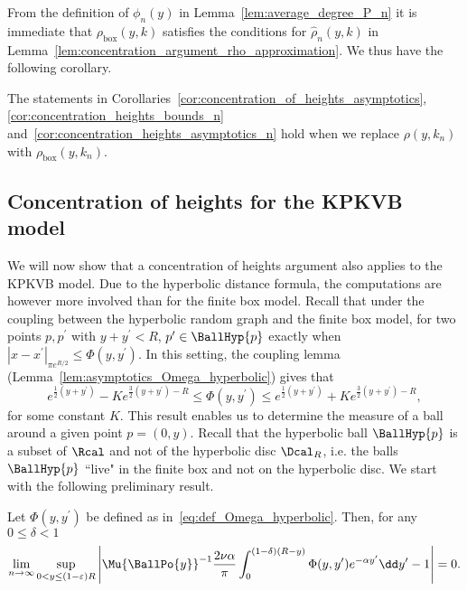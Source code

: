 From the definition of $\phi_n(y)$ in Lemma~\ref{lem:average_degree_P_n} it is immediate that $\rho_{\mathrm{box}}(y,k)$ satisfies the conditions for $\hat{\rho}_n(y,k)$ in Lemma~\ref{lem:concentration_argument_rho_approximation}. We thus have the following corollary.

\begin{corollary}\label{cor:concentration_of_heights_Gbox}
The statements in Corollaries~\ref{cor:concentration_of_heights_asymptotics}, \ref{cor:concentration_heights_bounds_n}
and~\ref{cor:concentration_heights_asymptotics_n} hold when we replace $\rho(y,k_n)$ with $\rho_{\text{box}}(y,k_n)$.
\end{corollary}

\subsection{Concentration of heights for the KPKVB model}\label{ssec:average_degree_HP_n}


We will now show that a concentration of heights argument also applies to the KPKVB model. Due to the hyperbolic distance formula, the computations are however more involved than for the finite box model. Recall that under the coupling between the hyperbolic random graph and the finite box model, for two points $p, p^\prime$ with $y + y^\prime < R$, $p^\prime \in \BallHyp{p}$ exactly when $|x-x^\prime|_{\pi e^{R/2}} \le \Phi(y,y^\prime)$. In this setting, the coupling lemma (Lemma~\ref{lem:asymptotics_Omega_hyperbolic}) gives that  
\[
	e^{\frac{1}{2}(y+y^\prime)} - K e^{\frac{3}{2}(y+y^\prime) - R} \leq \Phi(y, y^\prime) 
		\leq  e^{\frac{1}{2}(y+y^\prime)} + K e^{\frac{3}{2}(y+y^\prime) - R},
\]
for some constant $K$. This result enables us to determine the measure of a ball around a given point $p=(0,y)$. Recall that the hyperbolic ball $\BallHyp{p}$ is a subset of $\Rcal$ and not of the hyperbolic disc $\Dcal_{R}$, i.e. the balls $\BallHyp{p}$ ``live" in the finite box and not on the hyperbolic disc. We start with the following preliminary result.

\begin{lemma}\label{lem:hyperbolic_ball_lower_part}
Let $\Phi(y,y^\prime)$ be defined as in~\eqref{eq:def_Omega_hyperbolic}. Then, for any $0 \le \delta < 1$
\[
	\lim_{n \to \infty} \sup_{0 < y \le (1-\varepsilon)R} \left|\Mu{\BallPo{y}}^{-1} \frac{2\nu \alpha}{\pi} \int_0^{(1-\delta)(R-y)} \Phi(y,y^\prime) e^{-\alpha y^\prime} \dd y^\prime  - 1\right| = 0.
\]
\end{lemma}

